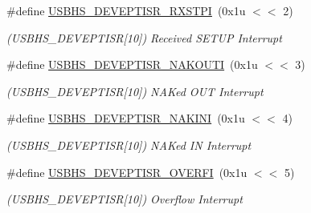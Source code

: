 \begin{DoxyCompactItemize}
\mbox{\label{group__SAMS70__USBHS_ga612669600cec1778ab5e97f869aee53b}} 
\#define \mbox{\hyperlink{group__SAMS70__USBHS_ga612669600cec1778ab5e97f869aee53b}{U\+S\+B\+H\+S\+\_\+\+D\+E\+V\+E\+P\+T\+I\+S\+R\+\_\+\+R\+X\+S\+T\+PI}}~(0x1u $<$$<$ 2)
\begin{DoxyCompactList}\small\item\em (U\+S\+B\+H\+S\+\_\+\+D\+E\+V\+E\+P\+T\+I\+SR\mbox{[}10\mbox{]}) Received S\+E\+T\+UP Interrupt \end{DoxyCompactList}\item 
\mbox{\label{group__SAMS70__USBHS_gae9b85a13a7b3e767ea4ff4480ffc4aa4}} 
\#define \mbox{\hyperlink{group__SAMS70__USBHS_gae9b85a13a7b3e767ea4ff4480ffc4aa4}{U\+S\+B\+H\+S\+\_\+\+D\+E\+V\+E\+P\+T\+I\+S\+R\+\_\+\+N\+A\+K\+O\+U\+TI}}~(0x1u $<$$<$ 3)
\begin{DoxyCompactList}\small\item\em (U\+S\+B\+H\+S\+\_\+\+D\+E\+V\+E\+P\+T\+I\+SR\mbox{[}10\mbox{]}) N\+A\+Ked O\+UT Interrupt \end{DoxyCompactList}\item 
\mbox{\label{group__SAMS70__USBHS_ga529fa6ed28b70b37d2fe4ab6e84f172a}} 
\#define \mbox{\hyperlink{group__SAMS70__USBHS_ga529fa6ed28b70b37d2fe4ab6e84f172a}{U\+S\+B\+H\+S\+\_\+\+D\+E\+V\+E\+P\+T\+I\+S\+R\+\_\+\+N\+A\+K\+I\+NI}}~(0x1u $<$$<$ 4)
\begin{DoxyCompactList}\small\item\em (U\+S\+B\+H\+S\+\_\+\+D\+E\+V\+E\+P\+T\+I\+SR\mbox{[}10\mbox{]}) N\+A\+Ked IN Interrupt \end{DoxyCompactList}\item 
\mbox{\label{group__SAMS70__USBHS_gacb8f42f7eb36900d7a54ab563c416d79}} 
\#define \mbox{\hyperlink{group__SAMS70__USBHS_gacb8f42f7eb36900d7a54ab563c416d79}{U\+S\+B\+H\+S\+\_\+\+D\+E\+V\+E\+P\+T\+I\+S\+R\+\_\+\+O\+V\+E\+R\+FI}}~(0x1u $<$$<$ 5)
\begin{DoxyCompactList}\small\item\em (U\+S\+B\+H\+S\+\_\+\+D\+E\+V\+E\+P\+T\+I\+SR\mbox{[}10\mbox{]}) Overflow Interrupt \end{DoxyCompactList}\item 
\mbox{\label{group__SAMS70__USBHS_ga8c7202988532c09acf4906a50eb93b1e}} 

\end{DoxyCompactItemize}
